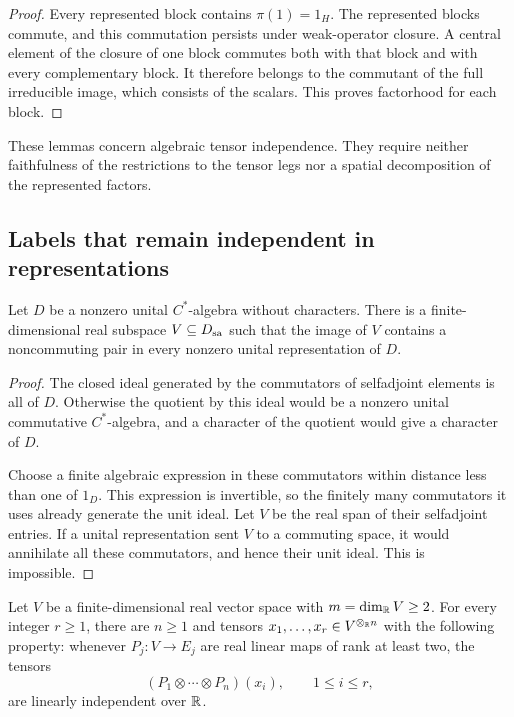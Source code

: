 \begin{proof}
Every represented block contains \(\pi(1)=1_H\). The represented blocks
commute, and this commutation persists under
weak-operator closure. A central element of the closure of one block
commutes both with that block and with every complementary block.
It therefore belongs to the commutant of the full irreducible image,
which consists of the scalars. This proves factorhood for each block.
\end{proof}

These lemmas concern algebraic tensor independence. They require neither
faithfulness of the restrictions to the tensor legs nor a spatial
decomposition of the represented factors.

\subsection{Labels that remain independent in representations}

\begin{lemma}
\label{lem:tensor-detecting-space}
Let \(D\) be a nonzero unital \(C^*\)-algebra without characters.
There is a finite-dimensional real subspace \(V\subseteq D_{\mathrm{sa}}\)
such that the image of \(V\) contains a noncommuting pair in every
nonzero unital representation of \(D\).
\end{lemma}

\begin{proof}
The closed ideal generated by the commutators of selfadjoint elements
is all of \(D\). Otherwise the quotient by this ideal would be a nonzero
unital commutative \(C^*\)-algebra, and a character of the quotient would
give a character of \(D\).

Choose a finite algebraic expression in these commutators within distance
less than one of \(1_D\). This expression is invertible, so the finitely
many commutators it uses already generate the unit ideal. Let \(V\) be
the real span of their selfadjoint entries. If a unital representation
sent \(V\) to a commuting space, it would annihilate all these
commutators, and hence their unit ideal. This is impossible.
\end{proof}

\begin{lemma}
\label{lem:tensor-real-labels}
Let \(V\) be a finite-dimensional real vector space with
\(m=\dim_{\mathbb R}V\ge2\). For every integer \(r\ge1\), there are \(n\ge1\)
and tensors \(x_1,\ldots,x_r\in V^{\otimes_{\mathbb R}n}\) with the following
property: whenever \(P_j:V\to E_j\) are real linear maps of rank at least
two, the tensors
\[
               (P_1\otimes\cdots\otimes P_n)(x_i),
               \qquad 1\le i\le r,
\]
are linearly independent over \(\mathbb R\).
\end{lemma}


